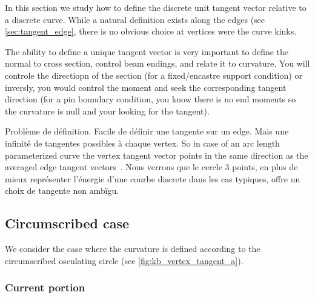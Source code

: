 In this section we study how to define the discrete unit tangent vector relative to a discrete curve. While a natural definition exists along the edges (see \cref{sec:tangent_edge}, there is no obvious choice at vertices were the curve kinks.

The ability to define a unique tangent vector is very important to define the normal to cross section, control beam endings, and relate it to curvature.
You will controle the directiopn of the section (for a fixed/encastre support condition) or inversly, you would control the moment and seek the corresponding tangent direction (for a pin boundary condition, you know there is no end moments so the curvature is null and your looking for the tangent).

Problème de définition. Facile de définir une tangente sur un edge. Mais une infinité de tangentes possibles à chaque vertex. So in case of an arc length parameterized curve the vertex tangent vector points in the same direction as the averaged edge tangent vectors~\cite[p.12]{Hoffmann2008}. Nous verrons que le cercle 3 points, en plus de mieux représenter l'énergie d'une courbe discrete dans les cas typiques, offre un choix de tangente non ambïgu.

\subsection{Circumscribed case}

We consider the case where the curvature is defined according to the circumscribed osculating circle (see \cref{fig:kb_vertex_tangent_a}). 

\subsubsection{Current portion}

